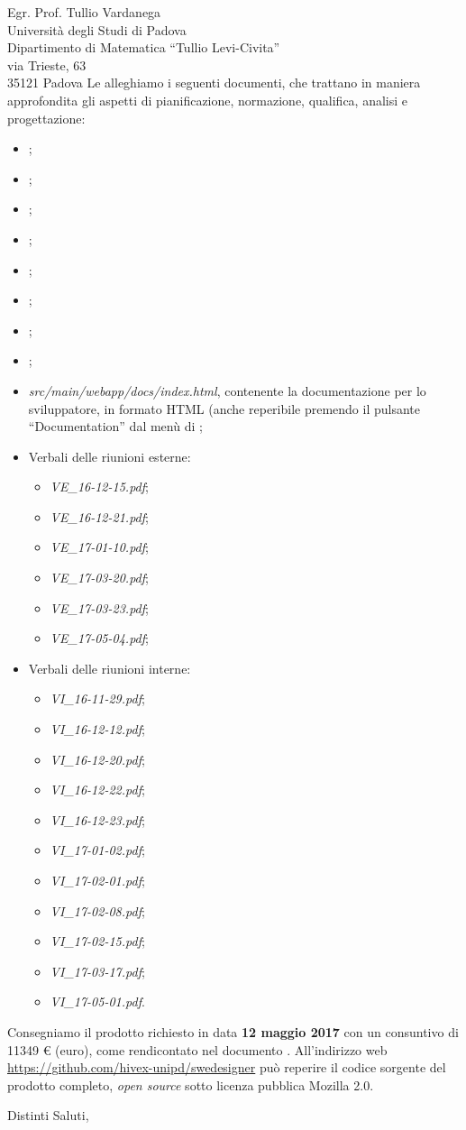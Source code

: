 \documentclass[a4paper]{letter} %
\begin{document}
\begin{letter}{Egr. Prof. Tullio Vardanega\\
Università degli Studi di Padova\\
Dipartimento di Matematica “Tullio Levi-Civita”\\
via Trieste, 63\\
35121 Padova}
Le alleghiamo i seguenti documenti, che trattano in maniera approfondita gli aspetti di pianificazione, normazione, qualifica, analisi e progettazione:
\begin{itemize}
	\item \NdP;
	\item \PdP;
	\item \PdQ;
	\item \AdR;
	\item \ST;
	\item \DP;
	\item \Glossario;
	\item \MU;
	\item \emph{src/main/webapp/docs/index.html}, contenente la documentazione per lo sviluppatore, in formato HTML (anche reperibile premendo il pulsante “Documentation” dal menù di \proj;
	\item Verbali delle riunioni esterne:
	\begin{itemize}
		\item \emph{VE\_16-12-15.pdf};
		\item \emph{VE\_16-12-21.pdf};
		\item \emph{VE\_17-01-10.pdf};
		\item \emph{VE\_17-03-20.pdf};
		\item \emph{VE\_17-03-23.pdf};
		\item \emph{VE\_17-05-04.pdf};
	\end{itemize}
	\item Verbali delle riunioni interne:
	\begin{itemize}
		\item \emph{VI\_16-11-29.pdf};
		\item \emph{VI\_16-12-12.pdf};
		\item \emph{VI\_16-12-20.pdf};
		\item \emph{VI\_16-12-22.pdf};
		\item \emph{VI\_16-12-23.pdf};
		\item \emph{VI\_17-01-02.pdf};
		\item \emph{VI\_17-02-01.pdf};
		\item \emph{VI\_17-02-08.pdf};
		\item \emph{VI\_17-02-15.pdf};
		\item \emph{VI\_17-03-17.pdf};
		\item \emph{VI\_17-05-01.pdf}.
	\end{itemize}
\end{itemize}

Consegniamo il prodotto richiesto in data \textbf{12 maggio 2017} con un consuntivo di \num{11349} \euro{} (euro), come rendicontato nel documento \PdP. All'indirizzo web \url{https://github.com/hivex-unipd/swedesigner} può reperire il codice sorgente del prodotto completo, \emph{open source} sotto licenza pubblica Mozilla 2.0.

\closing{Distinti Saluti,}

\end{letter}
\end{document}
